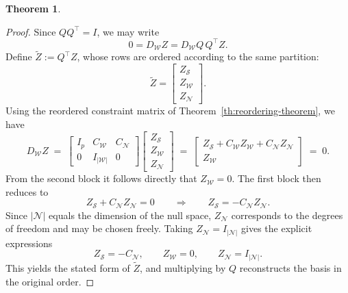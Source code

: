 \documentclass{book}
\theoremstyle{definition}
\newtheorem{theorem}{Theorem}[section]
\numberwithin{algorithm_}{chapter}
\begin{document}
{\begin{theorem}
\begin{proof}
Since $Q Q^\top = I$, we may write
\begin{equation}
    0 = D_\mathcal{W} Z 
      = D_\mathcal{W} Q \, Q^\top Z.
\end{equation}
Define $\tilde{Z} := Q^\top Z$, whose rows are ordered according to the same partition:
\begin{equation}
    \tilde{Z} =
    \begin{bmatrix}
        Z_\mathcal{S} \\[0.2em]
        Z_\mathcal{W} \\[0.2em]
        Z_\mathcal{N}
    \end{bmatrix}.
\end{equation}
Using the reordered constraint matrix of Theorem~\ref{th:reordering-theorem}, we have
\begin{equation}
    D_\mathcal{W} Z
    \; = \;
    \begin{bmatrix}
        I_p & C_\mathcal{W} & C_\mathcal{N} \\
        0   & I_{|\mathcal{W}|} & 0
    \end{bmatrix}
    \begin{bmatrix}
        Z_\mathcal{S} \\[0.2em]
        Z_\mathcal{W} \\[0.2em]
        Z_\mathcal{N}
    \end{bmatrix}
    \; = \;
    \begin{bmatrix}
        Z_\mathcal{S} + C_\mathcal{W} Z_\mathcal{W} + C_\mathcal{N} Z_\mathcal{N} \\[0.2em]
        Z_\mathcal{W}
    \end{bmatrix}
    \; = \; 0.
\end{equation}
From the second block it follows directly that $Z_\mathcal{W} = 0$. The first block then reduces to
\begin{equation}
    Z_\mathcal{S} + C_\mathcal{N} Z_\mathcal{N} = 0
    \qquad \Longrightarrow \qquad
    Z_\mathcal{S} = - C_\mathcal{N} Z_\mathcal{N}.
\end{equation}
Since $|\mathcal{N}|$ equals the dimension of the null space, $Z_\mathcal{N}$ corresponds to the degrees of freedom and may be chosen freely. Taking $Z_\mathcal{N} = I_{|\mathcal{N}|}$ gives the explicit expressions
\begin{equation}
    Z_\mathcal{S} = -C_\mathcal{N}, 
    \qquad
    Z_\mathcal{W} = 0,
    \qquad
    Z_\mathcal{N} = I_{|\mathcal{N}|}.
\end{equation}
This yields the stated form of $\tilde{Z}$, and multiplying by $Q$ reconstructs the basis in the original order.


\end{proof}
\end{theorem}}
\end{document}
